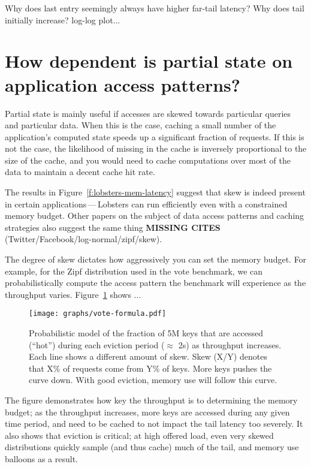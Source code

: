 \begin{inprogress}
  Why does last entry seemingly always have higher far-tail latency?
  Why does tail initially increase?
  log-log plot...
\end{inprogress}

\section{How dependent is partial state on application access patterns?}
\label{s:eval:patterns}

Partial state is mainly useful if accesses are skewed towards particular queries
and particular data. When this is the case, caching a small number of the
application's computed state speeds up a significant fraction of requests. If
this is not the case, the likelihood of missing in the cache is inversely
proportional to the size of the cache, and you would need to cache computations
over most of the data to maintain a decent cache hit rate.

The results in Figure~\ref{f:lobsters-mem-latency} suggest that skew is indeed
present in certain applications\,---\,Lobsters can run efficiently even with a
constrained memory budget. Other papers on the subject of data access patterns
and caching strategies also suggest the same thing \textbf{MISSING CITES}
(Twitter/Facebook/log-normal/zipf/skew).

The degree of skew dictates how aggressively you can set the memory budget.
For example, for the Zipf distribution used in the vote benchmark, we can
probabilistically compute the access pattern the benchmark will experience as
the throughput varies. Figure~\ref{f:vote-formula} shows ...

\begin{figure}[ht]
  \centering
  \texttt{[image: graphs/vote-formula.pdf]}
  \caption{Probabilistic model of the fraction of 5M keys that are accessed
  (``hot'') during each eviction period ($\approx$ 2s) as throughput increases.
  Each line shows a different amount of skew. Skew (X/Y) denotes that X\% of
  requests come from Y\% of keys. More keys pushes the curve down. With good
  eviction, memory use will follow this curve.}
  \label{f:vote-formula}
\end{figure}

The figure demonstrates how key the throughput is to determining the memory
budget; as the throughput increases, more keys are accessed during any given
time period, and need to be cached to not impact the tail latency too severely.
It also shows that eviction is critical; at high offered load, even very skewed
distributions quickly sample (and thus cache) much of the tail, and memory use
balloons as a result.


